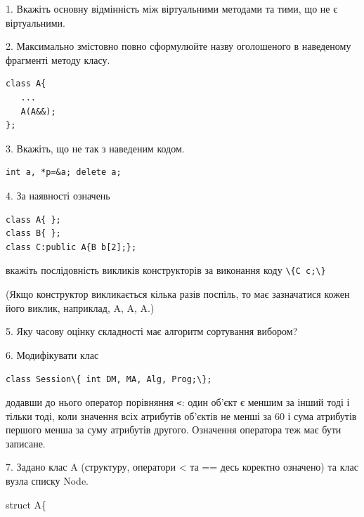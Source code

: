\documentclass[12pt, ukrainian]{article}
\def\code#1{\Verb!#1!}
\begin{document}
{%
1. Вкажіть основну відмінність між віртуальними методами та тими, що не є віртуальними.%
\par
\vspace{2mm}
2. Максимально змістовно повно сформулюйте назву оголошеного в наведеному фрагменті методу класу.
\vspace{-3mm}
\begin{verbatim}class A{
   ...
   A(A&&);
};\end{verbatim}
\vspace{-3mm}
\par
\vspace{2mm}
3. Вкажіть, що не так з наведеним кодом.
\vspace{-3mm}
\begin{verbatim}int a, *p=&a; delete a;\end{verbatim}
\vspace{-3mm}
\par
\vspace{2mm}
4. За наявності означень
\vspace{-3mm}
\begin{verbatim}
class A{ };
class B{ };
class C:public A{B b[2];};\end{verbatim}
\vspace{-3mm}
вкажіть послідовність викликів конструкторів за виконання коду \code{\{C c;\}} 

(Якщо конструктор викликається кілька разів поспіль, то має зазначатися кожен його виклик, наприклад, A, A, A.)

\vspace{2mm}
5. Яку часову оцінку складності має алгоритм сортування вибором?
\par
\vspace{2mm}
6. Модифікувати клас 

\qquad\code{class Session\{ int DM, MA, Alg, Prog;\};} 


додавши до нього оператор порівняння \code{<}: один об'єкт є меншим за інший тоді і тільки тоді, коли значення всіх атрибутів об'єктів не менші за 60 і сума атрибутів першого менша за суму атрибутів другого. Означення оператора теж має бути записане.%
\par
\vspace{2mm}
7. 
Задано клас A (структуру, оператори < та == десь коректно означено) та клас вузла списку Node.

struct A\{

}
\end{document}
